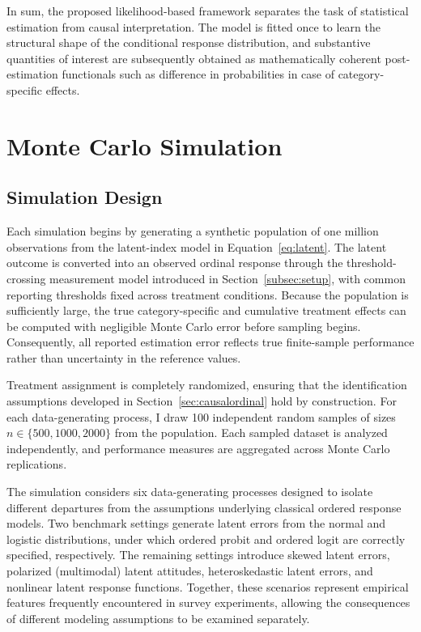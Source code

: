 \documentclass{article}
\begin{document}
In sum, the proposed likelihood-based framework separates the task of statistical estimation from causal interpretation. The model is fitted once to learn the structural shape of the conditional response distribution, and substantive quantities of interest are subsequently obtained as mathematically coherent post-estimation functionals such as difference in probabilities in case of category-specific effects.

\clearpage

\section{Monte Carlo Simulation}
\label{sec:simulation}

\subsection{Simulation Design}
\label{subsec:sim_design}

Each simulation begins by generating a synthetic population of one million observations from the latent-index model in Equation~\eqref{eq:latent}. The latent outcome is converted into an observed ordinal response through the threshold-crossing measurement model introduced in Section~\ref{subsec:setup}, with common reporting thresholds fixed across treatment conditions. Because the population is sufficiently large, the true category-specific and cumulative treatment effects can be computed with negligible Monte Carlo error before sampling begins. Consequently, all reported estimation error reflects true finite-sample performance rather than uncertainty in the reference values.

Treatment assignment is completely randomized, ensuring that the identification assumptions developed in Section~\ref{sec:causalordinal} hold by construction. For each data-generating process, I draw 100 independent random samples of sizes $n\in\{500,1000,2000\}$ from the population. Each sampled dataset is analyzed independently, and performance measures are aggregated across Monte Carlo replications.

The simulation considers six data-generating processes designed to isolate different departures from the assumptions underlying classical ordered response models. Two benchmark settings generate latent errors from the normal and logistic distributions, under which ordered probit and ordered logit are correctly specified, respectively. The remaining settings introduce skewed latent errors, polarized (multimodal) latent attitudes, heteroskedastic latent errors, and nonlinear latent response functions. Together, these scenarios represent empirical features frequently encountered in survey experiments, allowing the consequences of different modeling assumptions to be examined separately.
\end{document}
